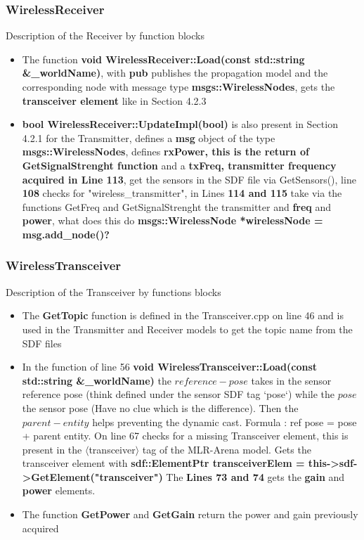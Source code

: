 \documentclass[11pt,a4paper]{article}
\begin{document}
\subsubsection{WirelessReceiver}

Description of the Receiver by function blocks

\begin{itemize}
\item The function \textbf{void WirelessReceiver::Load(const std::string \&{\_}worldName)}, with \textbf{pub} publishes the propagation model and the corresponding node with message type \textbf{msgs::WirelessNodes}, gets the \textbf{transceiver element} like in Section 4.2.3
\item \textbf{bool WirelessReceiver::UpdateImpl(bool)} is also present in Section 4.2.1 for the Transmitter, defines a \textbf{msg} object of the type \textbf{msgs::WirelessNodes}, defines \textbf{rxPower, this is the return of GetSignalStrenght function} and a \textbf{txFreq, transmitter frequency acquired in Line 113}, get the sensors in the SDF file via GetSensors(), line \textbf{108} checks for "wireless{\_}transmitter", in Lines \textbf{114 and 115} take via the functions GetFreq and GetSignalStrenght the transmitter and \textbf{freq} and \textbf{power}, what does this do \textbf{msgs::WirelessNode *wirelessNode = msg.add{\_}node()?}



\end{itemize}

\subsubsection{WirelessTransceiver}

Description of the Transceiver by functions blocks

\begin{itemize}
\item The \textbf{GetTopic} function is defined in the Transceiver.cpp on line 46 and is used in the Transmitter and Receiver models to get the topic name from the SDF files
\item In the function of line 56 \textbf{void WirelessTransceiver::Load(const std::string \&{\_}worldName)} the $reference-pose$ takes in the sensor reference pose (think defined under the sensor SDF tag `pose`) while the $pose$ the sensor pose (Have no clue which is the difference). Then the $parent-entity$ helps preventing the dynamic cast. Formula : ref pose = pose + parent entity.
On line 67 checks for a missing Transceiver element, this is present in the $\langle$transceiver$\rangle$ tag of the MLR-Arena model. Gets the transceiver element with \textbf{sdf::ElementPtr transceiverElem = this->sdf->GetElement("transceiver")}
The \textbf{Lines 73 and 74} gets the \textbf{gain} and \textbf{power} elements.
\item The function \textbf{GetPower} and \textbf{GetGain} return the power and gain previously acquired
\end{itemize}
\end{document}
